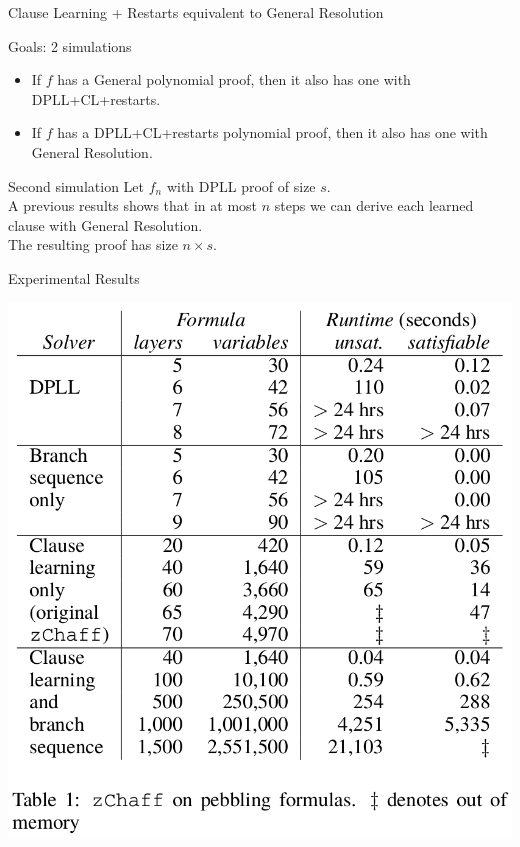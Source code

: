 \documentclass[page number]{beamer}
\begin{document}
\begin{frame}{Clause Learning + Restarts equivalent to General Resolution}
  \begin{exampleblock}{Goals: 2 simulations}
    \begin{itemize}
    \item If $f$ has a General polynomial proof, then it also has one with DPLL+CL+restarts.
    \item If $f$ has a DPLL+CL+restarts polynomial proof, then it also has one with General Resolution.
    \end{itemize}
  \end{exampleblock}
  \vfill
  \begin{block}{Second simulation}
    Let $f_n$ with DPLL proof of size $s$.\\
    A previous results shows that in at most $n$ steps we can derive each learned clause with General Resolution.\\
    The resulting proof has size $n\times s$.
  \end{block}
\end{frame}

\begin{frame}{Experimental Results}
  \begin{center}
    \includegraphics[scale=0.26]{table.png}
  \end{center}
\end{frame}
\end{document}
